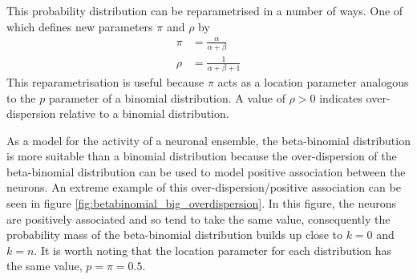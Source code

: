 \documentclass[a4paper,12pt]{article}
\theoremstyle{definition}
\begin{document}
      This probability distribution can be reparametrised in a number of ways. One of which defines new parameters $\pi$ and $\rho$ by
      \begin{align}\label{eq:betabinomial_reparam}
        \pi &= \frac{\alpha}{\alpha + \beta} \\
        \rho &= \frac{1}{\alpha + \beta + 1}
      \end{align}
      This reparametrisation is useful because $\pi$ acts as a location parameter analogous to the $p$ parameter of a binomial distribution. A value of $\rho > 0$ indicates over-dispersion relative to a binomial distribution.

      As a model for the activity of a neuronal ensemble, the beta-binomial distribution is more suitable than a binomial distribution because the over-dispersion of the beta-binomial distribution can be used to model positive association between the neurons. An extreme example of this over-dispersion/positive association can be seen in figure \ref{fig:betabinomial_big_overdispersion}. In this figure, the neurons are positively associated and so tend to take the same value, consequently the probability mass of the beta-binomial distribution builds up close to $k=0$ and $k=n$. It is worth noting that the location parameter for each distribution has the same value, $p=\pi=0.5$.
\end{document}
